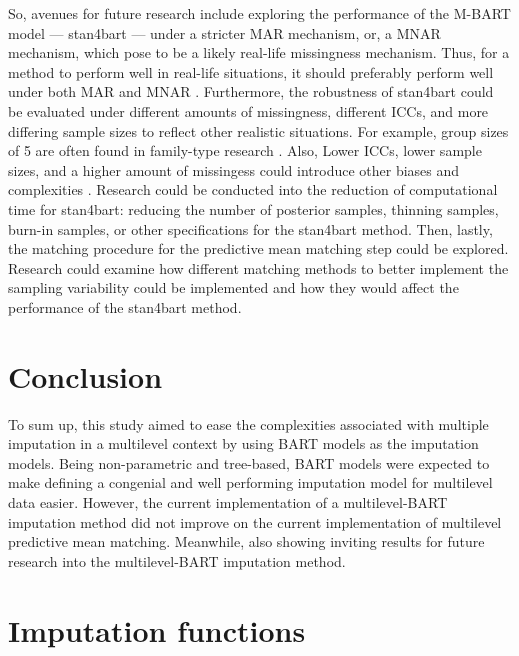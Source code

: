 \documentclass[3p,12pt,a4paper]{elsarticle}
\begin{document}
So, avenues for future research include exploring the performance of the M-BART model --- stan4bart --- under a stricter MAR mechanism, or, a MNAR mechanism, which \citet{oberman2023} pose to be a likely real-life missingness mechanism. Thus, for a method to perform well in real-life situations, it should preferably perform well under both MAR and MNAR \citep{oberman2023}. Furthermore, the robustness of stan4bart could be evaluated under different amounts of missingness, different ICCs, and more differing sample sizes to reflect other realistic situations. For example, group sizes of 5 are often found in family-type research \citep{maas2005}. Also, Lower ICCs, lower sample sizes, and a higher amount of missingess could introduce other biases and complexities \citep{enders2018,enders2018a,enders2020,mistler2017,akkayahocagil2023,grund2016,grund2018a,grund2018,ludtke2017,grund2021}. Research could be conducted into the reduction of computational time for stan4bart: reducing the number of posterior samples, thinning samples, burn-in samples, or other specifications for the stan4bart method. Then, lastly, the matching procedure for the predictive mean matching step could be explored. Research could examine how different matching methods to better implement the sampling variability \citep{buurenFlexibleImputationMissing2018} could be implemented and how they would affect the performance of the stan4bart method.

\section{Conclusion}

To sum up, this study aimed to ease the complexities associated with multiple imputation in a multilevel context by using BART models as the imputation models. Being non-parametric and tree-based, BART models were expected to make defining a congenial and well performing imputation model for multilevel data easier. However, the current implementation of a multilevel-BART imputation method did not improve on the current implementation of multilevel predictive mean matching. Meanwhile, also showing inviting results for future research into the multilevel-BART imputation method.

\newpage



\newpage
\appendix
\section{Imputation functions} \label{appendix:imputationfunctions}
\end{document}

